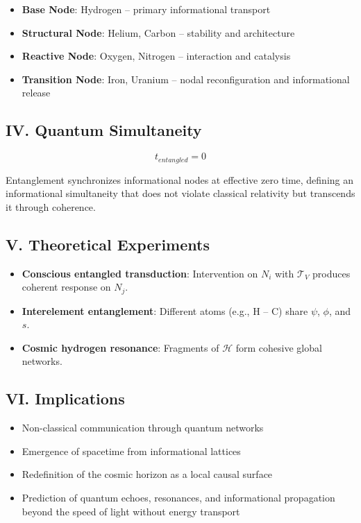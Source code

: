 \documentclass[12pt]{article}
\begin{document}
\begin{itemize}
    \item \textbf{Base Node}: Hydrogen – primary informational transport
    \item \textbf{Structural Node}: Helium, Carbon – stability and architecture
    \item \textbf{Reactive Node}: Oxygen, Nitrogen – interaction and catalysis
    \item \textbf{Transition Node}: Iron, Uranium – nodal reconfiguration and informational release
\end{itemize}

\subsection*{IV. Quantum Simultaneity}

\[
t_{entangled} = 0
\]

Entanglement synchronizes informational nodes at effective zero time, defining an informational simultaneity that does not violate classical relativity but transcends it through coherence.

\subsection*{V. Theoretical Experiments}

\begin{itemize}
    \item \textbf{Conscious entangled transduction}: Intervention on $N_i$ with $\mathcal{T}_V$ produces coherent response on $N_j$.
    \item \textbf{Interelement entanglement}: Different atoms (e.g., H -- C) share $\psi$, $\phi$, and $s$.
    \item \textbf{Cosmic hydrogen resonance}: Fragments of $\mathcal{H}$ form cohesive global networks.
\end{itemize}

\subsection*{VI. Implications}

\begin{itemize}
    \item Non-classical communication through quantum networks
    \item Emergence of spacetime from informational lattices
    \item Redefinition of the cosmic horizon as a local causal surface
    \item Prediction of quantum echoes, resonances, and informational propagation beyond the speed of light without energy transport
\end{itemize}
\end{document}
